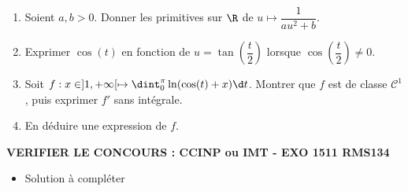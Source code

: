 \begin{enonce}
\begin{exercise}[ID={RMS134 E1511},subtitle={CCINP MP 2023},theme={analyse},concours={ccinp},annee={2023},filiere={MP}, difficulty={0}]
  \begin{enumerate}
  \item Soient $a,b>0$. Donner les primitives sur $\R$ de
    $u\mapsto\dfrac1{au^2+b}$.
  \item Exprimer $\cos(t)$ en fonction de
    $u=\tan\left(\dfrac{t}2\right)$ lorsque
    $\cos\left(\dfrac{t}2\right)\neq 0$.
  \item Soit $f:x\in]1,+\infty[\mapsto\dint_0^{\pi}\ln(\cos(t)+x)\d
    t$. Montrer que $f$ est de classe $\mathcal{C}^1$, puis exprimer
    $f'$ sans intégrale.
  \item En déduire une expression de $f$.
  \end{enumerate}
  {\bfseries VERIFIER LE CONCOURS : CCINP ou IMT - EXO 1511 RMS134}
\end{exercise}
\begin{solution}
  \begin{itemize}
    \item Solution à compléter
  \end{itemize}
\end{solution}
\end{enonce}